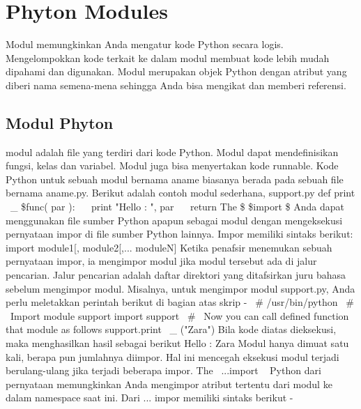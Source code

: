 
\section{Phyton Modules} 
Modul memungkinkan Anda mengatur kode Python secara logis. Mengelompokkan kode terkait ke dalam modul membuat kode lebih mudah dipahami dan digunakan. Modul merupakan objek Python dengan atribut yang diberi nama semena-mena sehingga Anda bisa mengikat dan memberi referensi.
\subsection{Modul Phyton}
modul adalah file yang terdiri dari kode Python. Modul dapat mendefinisikan fungsi, kelas dan variabel. Modul juga bisa menyertakan kode runnable.
Kode Python untuk sebuah modul bernama aname biasanya berada pada sebuah file bernama aname.py. Berikut adalah contoh modul sederhana, support.py  
 \hspace*{0.5in} def print \  \_  \$func( par ):  
 \hspace*{0.5in} ~~ print "Hello : ", par  
 \hspace*{0.5in} ~~ return  
The \$  \$import \$  \Statement  
Anda dapat menggunakan file sumber Python apapun sebagai modul dengan mengeksekusi pernyataan impor di file sumber Python lainnya. Impor memiliki sintaks berikut:  
 \hspace*{0.5in} import module1[, module2[,... moduleN]  
Ketika penafsir menemukan sebuah pernyataan impor, ia mengimpor modul jika modul tersebut ada di jalur pencarian. Jalur pencarian adalah daftar direktori yang ditafsirkan juru bahasa sebelum mengimpor modul. Misalnya, untuk mengimpor modul support.py, Anda perlu meletakkan perintah berikut di bagian atas skrip - 
 \hspace*{0.5in}  \  \#  \!/usr/bin/python 
 \hspace*{0.5in}  \  \#  \ Import module support 
 \hspace*{0.5in} import support 
 \hspace*{0.5in}  \  \#  \ Now you can call defined function that module as follows 
 \hspace*{0.5in} support.print \  \_  \func("Zara") 
Bila kode diatas dieksekusi, maka menghasilkan hasil sebagai berikut 
 \hspace*{0.5in} Hello : Zara
Modul hanya dimuat satu kali, berapa pun jumlahnya diimpor. Hal ini mencegah eksekusi modul terjadi berulang-ulang jika terjadi beberapa impor. 
The \  \from...import \  \Statement 
\noindent 
Python dari pernyataan memungkinkan Anda mengimpor atribut tertentu dari modul ke dalam namespace saat ini. Dari ... impor memiliki sintaks berikut - 
